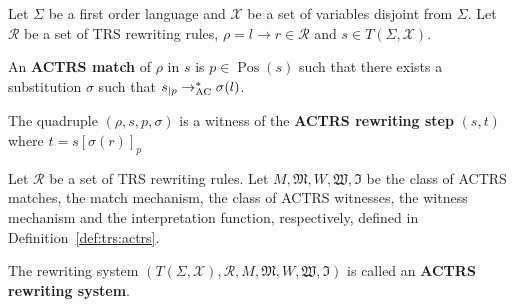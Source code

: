 \begin{definition}
  \label{def:trs:actrs}
  Let $\Sigma$ be a first order language and $\mathcal{X}$ be a set of variables disjoint from $\Sigma$.
  Let $\mathcal{R}$ be a set of TRS rewriting rules, $\rho = l \to r \in \mathcal{R}$ and $s \in T(\Sigma, \mathcal{X})$.

  An \textbf{ACTRS match} of $\rho$ in $s$ is $p \in \operatorname{Pos}(s)$ such that there exists a substitution $\sigma$ such that $s_{|p} \rightarrow_{\operatorname{AC}}^* \sigma(l)$. 


  The quadruple $(\rho, s, p, \sigma)$ is a witness of the \textbf{ACTRS rewriting step} $(s, t)$ where $t = s[\sigma(r)]_p$

\end{definition}

   


\begin{definition}
  Let $\mathcal{R}$ be a set of TRS rewriting rules. 
  Let $M, \mathfrak{M}, W, \mathfrak{W}, \mathfrak{I}$ be the class of ACTRS matches, the match mechanism, the class of ACTRS witnesses, the witness mechanism and the interpretation function, respectively, defined in Definition~\ref{def:trs:actrs}.

  The rewriting system $(T(\Sigma,\mathcal{X}), \mathcal{R}, M, \mathfrak{M}, W, \mathfrak{W}, \mathfrak{I})$ is called an \textbf{ACTRS rewriting system}.
\end{definition}

